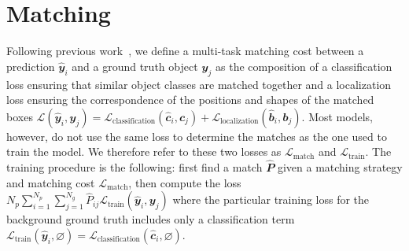 \section{Matching}

Following previous work~\cite{carion2020detr, zhu2020deformabledetr,ren2015fasterrcnn,redmon2016yolo,liu2016ssd}, we define a multi-task matching cost between a prediction $\hat{\mathbfit{y}}_i$ and a ground truth object $\mathbfit{y}_j$ as the composition of a classification loss ensuring that similar object classes are matched together and a localization loss ensuring the correspondence of the positions and shapes of the matched boxes $\label{eq:matching-loss}\mathcal{L}(\hat{\mathbfit{y}}_i, \mathbfit{y}_j) = \mathcal{L}_{\text{classification}}(\hat{\mathbfit{c}}_i, \mathbfit{c}_j) + \mathcal{L}_{\text{localization}}(\hat{\mathbfit{b}}_i, \mathbfit{b}_j)$. %
Most models, however, do not use the same loss to determine the matches as the one used to train the model. We therefore refer to these two losses as $\mathcal{L}_{\text{match}}$ and $\mathcal{L}_{\text{train}}$. The training procedure is the following: first find a match $\hat{\mathbfit{P}}$ given a matching strategy and matching cost $\mathcal{L}_{\text{match}}$, then compute the loss $N_p \sum_{i=1}^{N_p} \sum_{j=1}^{N_g} \hat{P}_{ij} \mathcal{L}_{\text{train}}(\hat{\mathbfit{y}}_i, \mathbfit{y}_j)$ where the particular training loss for the background ground truth includes only a classification term $\mathcal{L}_{\text{train}}(\hat{\mathbfit{y}}_i, \varnothing) = \mathcal{L}_{\text{classification}}(\hat{\mathbfit{c}}_i, \varnothing)$.

